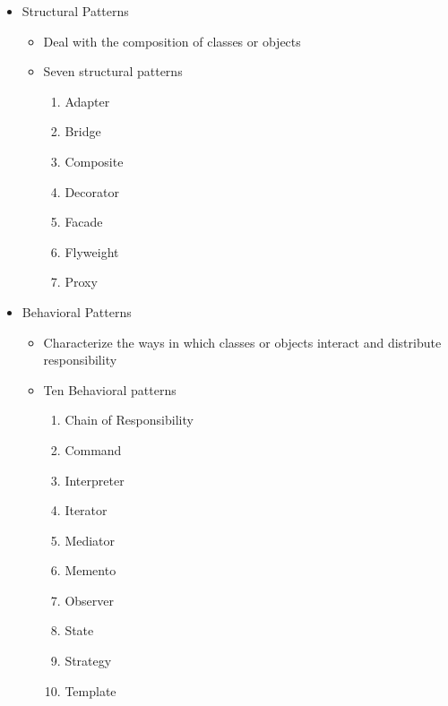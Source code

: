 \begin{itemize}
	\item Structural Patterns
	\begin{itemize}
		\item Deal with the composition of classes or objects
		\item Seven structural patterns\\[-10pt]
		\begin{minipage}[t]{0.25\textwidth}
			\begin{enumerate}
				\item Adapter
				\item Bridge
				\item Composite
				\item Decorator
			\end{enumerate}
		\end{minipage}
		\begin{minipage}[t]{0.4\textwidth}
			\begin{enumerate}
				\setcounter{enumi}{4}
				\item Facade
				\item Flyweight
				\item Proxy
			\end{enumerate}
		\end{minipage}
	\end{itemize}

	\item Behavioral Patterns
	\begin{itemize}
		\item Characterize the ways in which classes or objects interact and distribute responsibility
		\item Ten Behavioral patterns\\[-10pt]
		\begin{minipage}[t]{0.4\textwidth}
			\begin{enumerate}
				\item Chain of Responsibility
				\item Command
				\item Interpreter
				\item Iterator
				\item Mediator
			\end{enumerate}
		\end{minipage}
		\begin{minipage}[t]{0.4\textwidth}
			\begin{enumerate}
				\setcounter{enumi}{5}
				\item Memento
				\item Observer
				\item State
				\item Strategy
				\item Template
			\end{enumerate}
		\end{minipage}
	\end{itemize}


\end{itemize}
